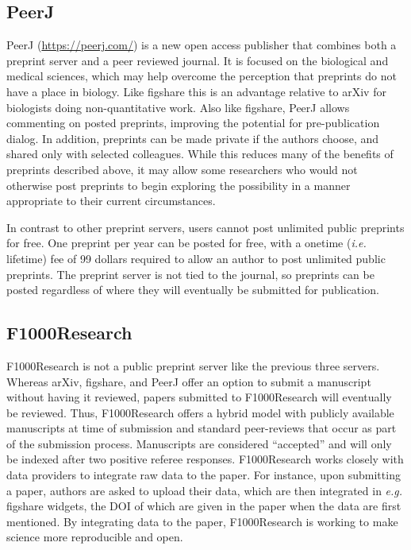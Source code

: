 \documentclass[letterpaper,twocolumn,superscriptaddress,showkeys,longbibliography]{revtex4-1}
\begin{document}
\subsection{PeerJ}

PeerJ (\href{https://peerj.com/}{https://peerj.com/}) is a new open access
publisher that combines both a preprint server and a peer reviewed journal.  It
is focused on the biological and medical sciences, which may help overcome the
perception that preprints do not have a place in biology. Like figshare this is
an advantage relative to arXiv for biologists doing non-quantitative work.  Also
like figshare, PeerJ allows commenting on posted preprints, improving the
potential for pre-publication dialog. In addition, preprints can be made private
if the authors choose, and shared only with selected colleagues. While this
reduces many of the benefits of preprints described above, it may allow some
researchers who would not otherwise post preprints to begin exploring the
possibility in a manner appropriate to their current circumstances.

In contrast to other preprint servers, users cannot post unlimited public
preprints for free. One preprint per year can be posted for free, with a onetime
(\emph{i.e.} lifetime) fee of 99 dollars required to allow an author to post
unlimited public preprints. The preprint server is not tied to the journal, so
preprints can be posted regardless of where they will eventually be submitted
for publication.

\subsection{F1000Research}\label{f1000r}

F1000Research is not a public preprint server like the previous three servers.
Whereas arXiv, figshare, and PeerJ offer an option to submit a manuscript
without having it reviewed, papers submitted to F1000Research will eventually be
reviewed. Thus, F1000Research offers a hybrid model with publicly available
manuscripts at time of submission and standard peer-reviews that occur as part
of the submission process. Manuscripts are considered ``accepted'' and will only
be indexed after two positive referee responses. F1000Research works closely
with data providers to integrate raw data to the paper. For instance, upon
submitting a paper, authors are asked to upload their data, which are then
integrated in \emph{e.g.} figshare widgets, the DOI of which are given in the
paper when the data are first mentioned.  By integrating data to the paper,
F1000Research is working to make science more reproducible and open.
\end{document}
